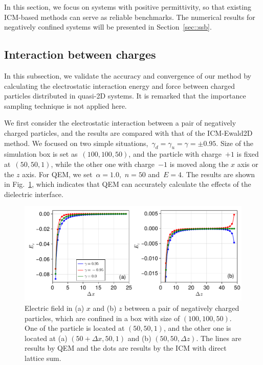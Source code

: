 \begin{rmk}
    In this section, we focus on systems with positive permittivity, so that existing ICM-based methods can serve as reliable benchmarks. The numerical results for negatively confined systems will be presented in Section~\ref{sec::ssb}.
\end{rmk}

\subsection{Interaction between charges}

In this subsection, we validate the accuracy and convergence of our method by calculating the electrostatic interaction energy and force between charged particles distributed in quasi-2D systems.
It is remarked that the importance sampling technique is not applied here.

We first consider the electrostatic interaction between a pair of negatively charged particles, and the results are compared with that of the ICM-Ewald2D method.
We focused on two simple situations,~$\gamma_{d} = \gamma_{u} = \gamma = \pm 0.95$.
Size of the simulation box is set as~$(100, 100, 50)$, and the particle with charge~$+1$ is fixed at~$(50, 50, 1)$, while the other one with charge~$-1$ is moved along the $x$ axis or the $z$ axis.
For QEM, we set~$\alpha = 1.0$,~$n = 50$ and~$E = 4$.
The results are shown in Fig.~\ref{fig:E_xyz}, which indicates that QEM can accurately calculate the effects of the dielectric interface.

\begin{figure}[htb]
    \centering
    \includegraphics[width = \linewidth]{figs/E_xyz.pdf}
    \caption{
        Electric field in (a) $x$ and (b) $z$ between a pair of negatively charged particles, which are confined in a box with size of $(100, 100, 50)$.
        One of the particle is located at $(50, 50, 1)$, and the other one is located at (a) $(50 + \Delta x, 50, 1)$ and (b) $(50, 50, \Delta z)$.
        The lines are results by QEM and the dots are results by the ICM with direct lattice sum.
    }
    \label{fig:E_xyz}
\end{figure}

